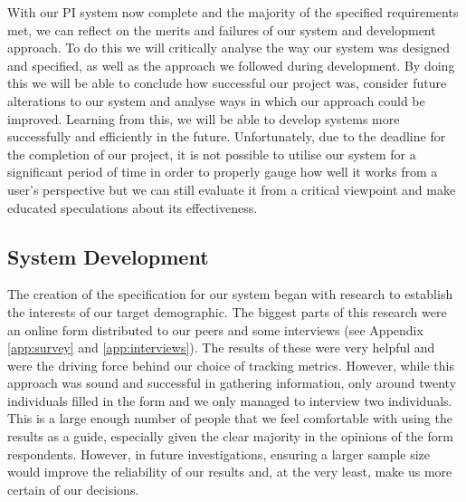 \documentclass[11pt]{article}
\begin{document}
With our PI system now complete and the majority of the specified requirements met, we can 
reflect on the merits and failures of our system and development approach. To do 
this we will critically analyse the way our system was designed and specified, 
as well as the approach we followed during development. By doing this we will 
be able to conclude how successful our project was, consider
future alterations to our system and analyse ways in which our approach could 
be improved. Learning from this, we will be able to develop systems more 
successfully and efficiently in the future. Unfortunately, due to the deadline for the 
completion of our  project, it is not possible to utilise our system for a
significant period of time in order to properly gauge how well it works from 
a user's perspective but we can still evaluate it from a critical viewpoint 
and make educated speculations about its effectiveness.\par

\subsection{System Development} 

The creation of the specification for our system began with research to establish
the interests of our target demographic. The biggest parts of this research
were an online form distributed to our peers and some interviews (see Appendix
\ref{app:survey} and \ref{app:interviews}). The results of these were very
helpful and were the driving force behind our choice of tracking metrics.
However, while this approach was sound and successful in gathering information,
only around twenty individuals filled in the form and we only managed to
interview two individuals. This is a large enough number of people that we feel
comfortable with using the results as a guide, especially given the clear
majority in the opinions of the form respondents. However, in future investigations, ensuring
a larger sample size would improve the reliability of our results and, at the
very least, make us more certain of our decisions.\par
\end{document}
